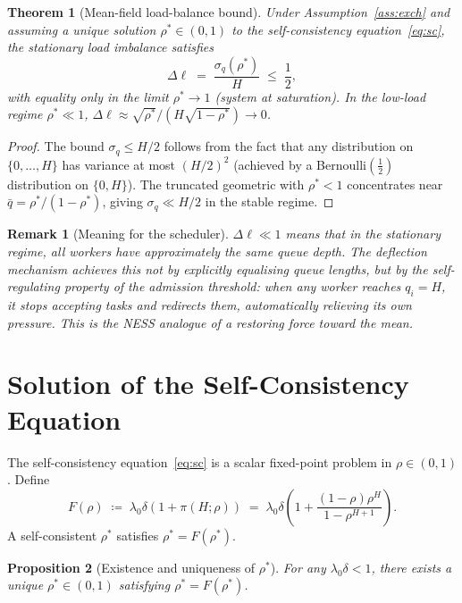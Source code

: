 \documentclass[11pt,a4paper]{article}
\newtheorem{theorem}{Theorem}[section]
\newtheorem{proposition}[theorem]{Proposition}
\newtheorem{remark}{Remark}[section]
\begin{document}
\begin{theorem}[Mean-field load-balance bound]
\label{thm:lb}
Under Assumption~\ref{ass:exch} and assuming a unique solution
$\rho^* \in (0,1)$ to the self-consistency equation~\eqref{eq:sc},
the stationary load imbalance satisfies
\[
  \Delta\ell \;=\; \frac{\sigma_q(\rho^*)}{H}
  \;\leq\; \frac{1}{2},
\]
with equality only in the limit $\rho^* \to 1$ (system at
saturation).  In the low-load regime $\rho^* \ll 1$,
$\Delta\ell \approx \sqrt{\rho^*}/(H\sqrt{1-\rho^*}) \to 0$.
\end{theorem}

\begin{proof}
The bound $\sigma_q \leq H/2$ follows from the fact that any
distribution on $\{0,\ldots,H\}$ has variance at most $(H/2)^2$
(achieved by a Bernoulli$(\frac{1}{2})$ distribution on $\{0,H\}$).
The truncated geometric with $\rho^* < 1$ concentrates near
$\bar{q} = \rho^*/(1-\rho^*)$, giving $\sigma_q \ll H/2$ in
the stable regime.
\end{proof}

\begin{remark}[Meaning for the scheduler]
$\Delta\ell \ll 1$ means that in the stationary regime, all workers
have approximately the same queue depth.  The deflection mechanism
achieves this not by explicitly equalising queue lengths, but by
the \emph{self-regulating} property of the admission threshold:
when any worker reaches $q_i = H$, it stops accepting tasks and
redirects them, automatically relieving its own pressure.
This is the NESS analogue of a restoring force toward the mean.
\end{remark}

\section{Solution of the Self-Consistency Equation}
\label{sec:sc}

The self-consistency equation~\eqref{eq:sc} is a scalar fixed-point
problem in $\rho \in (0,1)$.  Define
\[
  F(\rho) \;\coloneqq\; \lambda_0\delta\!\left(1 + \pi(H;\rho)\right)
          \;=\; \lambda_0\delta\!\left(1 +
                \frac{(1-\rho)\rho^H}{1-\rho^{H+1}}\right).
\]
A self-consistent $\rho^*$ satisfies $\rho^* = F(\rho^*)$.

\begin{proposition}[Existence and uniqueness of $\rho^*$]
\label{prop:fp}
For any $\lambda_0\delta < 1$, there exists a unique
$\rho^* \in (0,1)$ satisfying $\rho^* = F(\rho^*)$.
\end{proposition}
\end{document}
